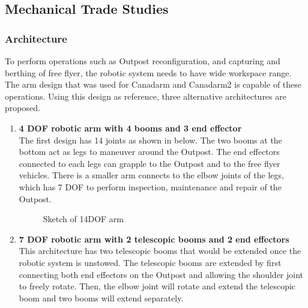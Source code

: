 \subsection{Mechanical Trade Studies}
\subsubsection{Architecture}
\label{sect:architectureto}
To perform operations such as Outpost reconfiguration, and capturing and berthing of free flyer, the robotic system needs to have wide workspace range. The arm design that was used for Canadarm and Canadarm2 is capable of these operations. Using this design as reference, three alternative architectures are proposed. 

\begin{enumerate}
\item{\textbf{4 DOF robotic arm with 4 booms and 3 end effector}\\
The first design has 14 joints as shown in  below. The two booms at the bottom act as legs to maneuver around the Outpost. The end effectors connected to each legs can grapple to the Outpost and to the free flyer vehicles. There is a smaller arm connects to the elbow joints of the legs, which has 7 DOF to perform inspection, maintenance and repair of the Outpost.
\begin{figure}[H]
\centering
\caption{Sketch of 14DOF arm}
\label{fig:14dof}
\end{figure}
}
\item{\textbf{7 DOF robotic arm with 2 telescopic booms and 2 end effectors}\\
This architecture has two telescopic booms that would be extended once the robotic system is unstowed. The telescopic booms are extended by first connecting both end effectors on the Outpost and allowing the shoulder joint to freely rotate. Then, the elbow joint will rotate and extend the telescopic boom and two booms will extend separately.

}
\end{enumerate}
